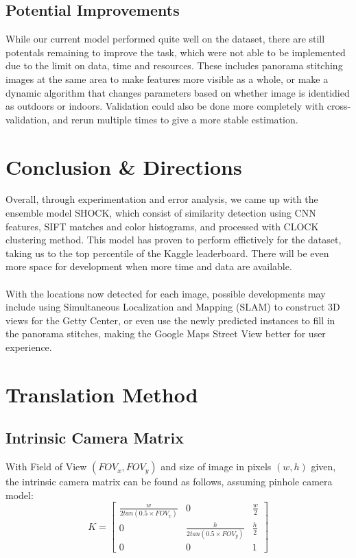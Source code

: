 \documentclass[11pt]{article}
\begin{document}
\begin{multicols}{2}
\subsection{Potential Improvements}
\noindent While our current model performed quite well on the dataset, there are still potentals remaining to improve the task, which were not able to be implemented due to the limit on data, time and resources. These includes panorama stitching images at the same area to make features more visible as a whole, or make a dynamic algorithm that changes parameters based on whether image is identidied as outdoors or indoors. Validation could also be done more completely with cross-validation, and rerun multiple times to give a more stable estimation.

\section{Conclusion \& Directions}
\noindent Overall, through experimentation and error analysis, we came up with the ensemble model SHOCK, which consist of similarity detection using CNN features, SIFT matches and color histograms, and processed with CLOCK clustering method. This model has proven to perform effictively for the dataset, taking us to the top percentile of the Kaggle leaderboard. There will be even more space for development when more time and data are available.\\~\\
With the locations now detected for each image, possible developments may include using Simultaneous Localization and Mapping (SLAM) to construct 3D views for the Getty Center, or even use the newly predicted instances to fill in the panorama stitches, making the Google Maps Street View better for user experience.


\newpage



\appendix
\section{Translation Method}\label{translation}

\subsection{Intrinsic Camera Matrix}
\noindent With Field of View $(FOV_x,FOV_y)$ and size of image in pixels $(w,h)$ given, the intrinsic camera matrix can be found as follows, assuming pinhole camera model:
\[K = 
\begin{bmatrix}
\frac{w}{2tan(0.5 \times FOV_x)} & 0 & \frac{w}{2}\\
0 & \frac{h}{2tan(0.5 \times FOV_y)} & \frac{h}{2}\\
0 & 0 & 1 
\end{bmatrix}
\]


\end{multicols}
\end{document}
